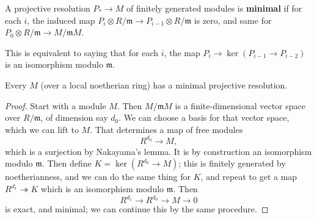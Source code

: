 \begin{definition}
A projective resolution $P_* \to M$ of finitely generated
modules is \textbf{minimal} if for each $i$, the
induced map $P_i \otimes R/\mathfrak{m} \to P_{i-1} \otimes
R/\mathfrak{m}$ is
zero, and same for $P_0 \otimes R/\mathfrak{m} \to
M/\mathfrak{m}M$.
\end{definition}

This is equivalent to saying that for each $i$, the map $P_i
\to\ker(P_{i-1}
\to P_{i-2})$ is an isomorphism modulo $\mathfrak{m}$.

\begin{proposition}
Every $M$ (over a local noetherian ring) has a minimal
projective resolution.
\end{proposition}
\begin{proof}
Start with a module $M$. Then $M/\mathfrak{m}M$ is a
finite-dimensional vector
space over $R/\mathfrak{m}$, of dimension say $d_0$. We can
choose a basis for that vector space, which
we can lift to $M$. That determines a map of free modules
\[ R^{d_0} \to M,  \]
which is a surjection by Nakayama's lemma. It is by construction
an
isomorphism modulo $\mathfrak{m}$. Then define $K =
\ker(R^{d_0}\to M)$; this
is finitely generated by noetherianness, and we
can do the same thing for $K$, and repeat to get a map $R^{d_1}
\twoheadrightarrow K$ which is an isomorphism modulo
$\mathfrak{m}$. Then
\[ R^{d_1} \to R^{d_0} \to M \to 0  \]
is exact, and minimal; we can continue this by the same
procedure.
\end{proof}


